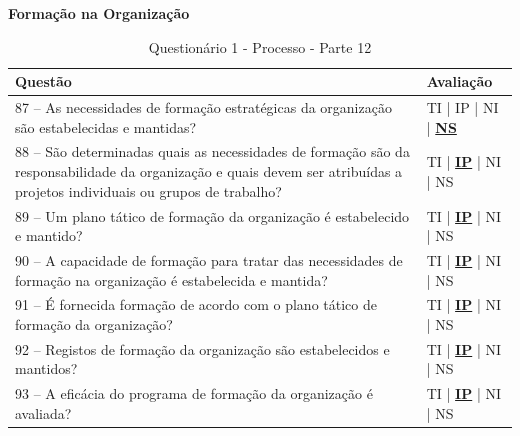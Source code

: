 \documentclass[openany,10pt,a4paper]{article}
\begin{document}
\begin{appendix}
	\begin{table}[H]
	\textbf{Formação na Organização}
		\centering
		\caption{Questionário 1 - Processo - Parte 12}
		\begin{tabular}{|p{5in}p{1in}|}		
			\hline
			\textbf{Questão}  & \textbf{Avaliação}\\ 
			\hline
			87 – As necessidades de formação estratégicas da organização são estabelecidas e mantidas?
	 & TI | IP | NI | \underline{\textbf{NS}} \\
			\hline
			88 – São determinadas quais as necessidades de formação são da responsabilidade da 
	organização e quais devem ser atribuídas a projetos individuais ou grupos de trabalho?
	 & TI | \underline{\textbf{IP}} | NI | NS \\
			\hline
			89 – Um plano tático de formação da organização é estabelecido e mantido?
	 & TI | \underline{\textbf{IP}} | NI | NS \\
			\hline
			90 – A capacidade de formação para tratar das necessidades de formação na organização é 
	estabelecida e mantida?
	 & TI | \underline{\textbf{IP}} | NI | NS \\
			\hline
			91 – É fornecida formação de acordo com o plano tático de formação da organização?
	  & TI | \underline{\textbf{IP}} | NI | NS \\
			\hline
			92 – Registos de formação da organização são estabelecidos e mantidos?
	 & TI | \underline{\textbf{IP}} | NI | NS \\
	 \hline
			93 – A eficácia do programa de formação da organização é avaliada?
	 & TI | \underline{\textbf{IP}} | NI | NS \\
			\hline
		\end{tabular} 
	\end{table}
	

\end{appendix}
\end{document}
